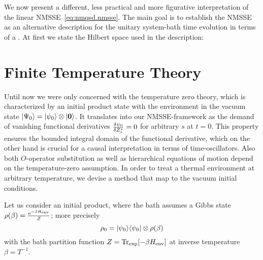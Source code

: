 
We now present a different, less practical and more figurative interpretation of the linear NMSSE~\ref{eq:nmqsd.nmsse}.
The main goal is to establish the NMSSE as an alternative description for the unitary system-bath time evolution in terms of a .
At first we state the Hilbert space used in the description:

\section{Finite Temperature Theory}
\label{sec:nmqsd.temperature}
%

Until now we were only concerned with the temperature zero theory, which is characterized by an initial product state with the environment in the vacuum state $| \Psi_0 \rangle = | \psi_0 \rangle \otimes | \boldsymbol{0} \rangle$.
It translates into our NMSSE-framework as the demand of vanishing functional derivatives $\frac{\delta \psi_0}{\delta {Z}^*_s} = 0$ for arbitrary $s$ at $t=0$.
This property ensures the bounded integral domain of the functional derivative, which on the other hand is crucial for a causal interpretation in terms of time-oscillators.
Also both $O$-operator substitution as well as hierarchical equations of motion depend on the temperature-zero assumption.
In order to treat a thermal environment at arbitrary temperature, we devise a method that map to the vacuum initial conditions.

Let us consider an initial product, where the bath assumes a Gibbs state $\rho(\beta) = \frac{\exp[-\beta \Henv]}{Z}$; more precisely
\begin{equation}
  \rho_0 = | \psi_0 \rangle\langle \psi_0 | \otimes \rho(\beta)
  \label{eq:nmqsd.initial_rho}
\end{equation}
with the bath partition function $Z = \Tr \exp[-\beta \Henv]$ at inverse temperature $\beta = T^{-1}$.\\


